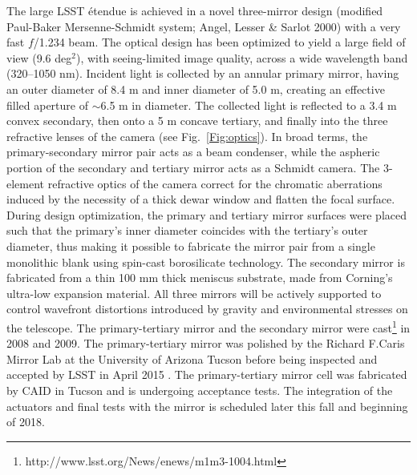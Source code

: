 The large LSST \'etendue is achieved in a novel three-mirror design (modified
Paul-Baker Mersenne-Schmidt system; Angel, Lesser \& Sarlot 2000) with a very fast $f$/1.234 beam. The optical
design has been optimized to yield a large field of view (9.6 deg$^2$),
with seeing-limited image quality, across a wide wavelength band (320--1050
nm). Incident light is collected by an annular primary mirror, having
an outer diameter of 8.4 m and inner diameter of 5.0 m, creating an effective filled aperture of
$\sim$6.5 m in diameter. The collected light is reflected to a 3.4 m convex secondary, then onto
a 5 m concave tertiary, and finally  into the three refractive lenses of the camera (see Fig.~\ref{Fig:optics}).
In broad terms, the primary-secondary mirror pair acts as a beam condenser, while the aspheric portion of
the secondary and tertiary mirror acts as a Schmidt camera.  The 3-element refractive optics of the camera
correct for the chromatic aberrations induced by the necessity of a thick dewar window and flatten the
focal surface.  During design optimization, the primary and tertiary mirror surfaces were placed such that the primary's
inner diameter coincides with the tertiary's outer diameter, thus making it possible to fabricate the mirror pair from a
single monolithic blank using spin-cast borosilicate technology. The secondary mirror is fabricated from
a thin 100 mm thick meniscus substrate, made from Corning's ultra-low expansion material. All
three mirrors will be actively supported to control wavefront distortions
introduced by gravity and environmental stresses on the telescope.
The primary-tertiary mirror and the secondary mirror were
cast\footnote{http://www.lsst.org/News/enews/m1m3-1004.html}  in 2008
and 2009.  The primary-tertiary mirror was polished by the Richard F.Caris Mirror Lab at the University of Arizona Tucson before being inspected and accepted by LSST in April 2015 \cite{Araujo16}. The  primary-tertiary mirror cell was fabricated by CAID in Tucson and is undergoing acceptance tests. The integration of the actuators and final tests with the mirror is scheduled later this fall and beginning of 2018. 

